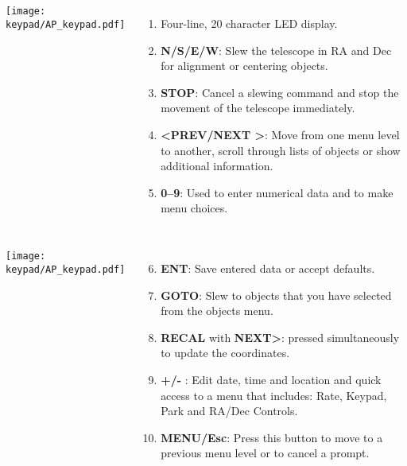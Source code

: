\begin{frame}[t]{\insertsubsectionhead}
  \begin{columns}[T]
      \centering
      \texttt{[image: keypad/AP\_keypad.pdf]}
      \begin{enumerate}
        \item Four-line, 20 character LED display.
        \item \textbf{N/S/E/W}: Slew the telescope in RA and Dec for alignment
            or centering objects.
        \item \textbf{STOP}: Cancel a slewing command and stop the movement of
            the telescope immediately.
        \item \textbf{\textless PREV/NEXT \textgreater}: Move from one menu
            level to another, scroll through lists of objects or show
            additional information.
        \item \textbf{0--9}: Used to enter numerical data and to make menu
            choices.
      \end{enumerate}
  \end{columns}
\end{frame}


\begin{frame}[t]{\insertsubsectionhead}
  \begin{columns}[T]
      \centering
      \texttt{[image: keypad/AP\_keypad.pdf]}
      \begin{enumerate}
        \setcounter{enumi}{5}
          \item \textbf{ENT}: Save entered data or accept defaults.
          \item \textbf{GOTO}: Slew to objects that you have selected from the
              objects menu.
          \item \textbf{RECAL} with \textbf{NEXT>}: pressed simultaneously to
              update the coordinates.  
          \item \textbf{+/-} : Edit date, time and location and quick access to a
              menu that includes: Rate, Keypad, Park and RA/Dec Controls.  
          \item \textbf{MENU/Esc}: Press this button to move to a previous menu
              level or to cancel a prompt.
      \end{enumerate}
  \end{columns}
\end{frame}

